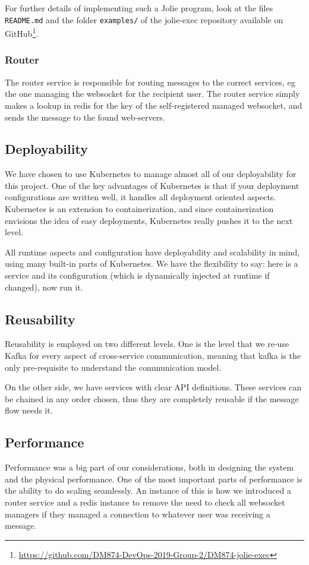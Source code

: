 For further details of implementing such a Jolie program, look at the files \texttt{README.md} and the folder \texttt{examples/} of the jolie-exec repository available on GitHub\footnote{\url{https://github.com/DM874-DevOps-2019-Group-2/DM874-jolie-exec}}.

\subsubsection{Router}
The router service is responsible for routing messages to the correct services, eg the one managing the websocket for the recipient user.
The router service simply makes a lookup in redis for the key of the self-registered managed websocket, and sends the message to the found web-servers.
\subsection{Deployability}
We have chosen to use Kubernetes to manage almost all of our deployability for this project.
One of the key advantages of Kubernetes is that if your deployment configurations are written well, it handles all deployment oriented aspects.
Kubernetes is an extension to containerization, and since containerization envisions the idea of easy deployments, Kubernetes really pushes it to the next level.

All runtime aspects and configuration have deployability and scalability in mind, using many built-in parts of Kubernetes.
We have the flexibility to say: here is a service and its configuration (which is dynamically injected at runtime if changed), now run it.

\subsection{Reusability}
Reusability is employed on two different levels.
One is the level that we re-use Kafka for every aspect of cross-service communication, meaning that kafka is the only pre-requisite to understand the communication model.

On the other side, we have services with clear API definitions.
These services can be chained in any order chosen, thus they are completely reusable if the message flow needs it.
\subsection{Performance}
Performance was a big part of our considerations, both in designing the system and the physical performance.
One of the most important parts of performance is the ability to do scaling seamlessly.
An instance of this is how we introduced a router service and a redis instance to remove the need to check all websocket managers if they managed a connection to whatever user was receiving a message.

